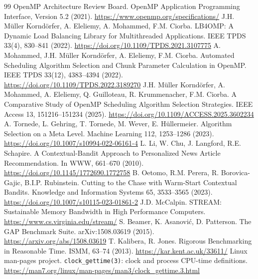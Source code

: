 \documentclass[conference]{IEEEtran}
\newcommand{\code}[1]{\texttt{#1}}
\begin{document}
\begin{thebibliography}{99}
 OpenMP Architecture Review Board. OpenMP Application
Programming Interface, Version 5.2 (2021).
\url{https://www.openmp.org/specifications/}
 J.H. M\"uller Kornd\"orfer, A. Eleliemy, A. Mohammed,
F.M. Ciorba. LB4OMP: A Dynamic Load Balancing Library for Multithreaded
Applications. IEEE TPDS 33(4), 830--841 (2022).
\url{https://doi.org/10.1109/TPDS.2021.3107775}
 A. Mohammed, J.H. M\"uller Kornd\"orfer, A. Eleliemy,
F.M. Ciorba. Automated Scheduling Algorithm Selection and Chunk Parameter
Calculation in OpenMP. IEEE TPDS 33(12), 4383--4394 (2022).
\url{https://doi.org/10.1109/TPDS.2022.3189270}
 J.H. M\"uller Kornd\"orfer, A. Mohammed, A. Eleliemy,
Q. Guilloteau, R. Krummenacher, F.M. Ciorba. A Comparative Study of OpenMP
Scheduling Algorithm Selection Strategies. IEEE Access 13, 151216--151234
(2025). \url{https://doi.org/10.1109/ACCESS.2025.3602234}
 A. Tornede, L. Gehring, T. Tornede, M. Wever,
E. H\"ullermeier. Algorithm Selection on a Meta Level. Machine Learning 112,
1253--1286 (2023). \url{https://doi.org/10.1007/s10994-022-06161-4}
 L. Li, W. Chu, J. Langford, R.E. Schapire.
A Contextual-Bandit Approach to Personalized News Article Recommendation.
In WWW, 661--670 (2010). \url{https://doi.org/10.1145/1772690.1772758}
 B. Oetomo, R.M. Perera, R. Borovica-Gajic,
B.I.P. Rubinstein. Cutting to the Chase with Warm-Start Contextual Bandits.
Knowledge and Information Systems 65, 3533--3565 (2023).
\url{https://doi.org/10.1007/s10115-023-01861-2}
 J.D. McCalpin. STREAM: Sustainable Memory Bandwidth in
High Performance Computers. \url{https://www.cs.virginia.edu/stream/}
 S. Beamer, K. Asanovi\'c, D. Patterson. The GAP Benchmark
Suite. arXiv:1508.03619 (2015). \url{https://arxiv.org/abs/1508.03619}
 T. Kalibera, R. Jones. Rigorous Benchmarking in Reasonable
Time. ISMM, 63--74 (2013). \url{https://kar.kent.ac.uk/33611/}
 Linux man-pages project. \code{clock\_gettime(3)}:
clock and process CPU-time definitions.
\url{https://man7.org/linux/man-pages/man3/clock_gettime.3.html}
\end{thebibliography}
\end{document}
